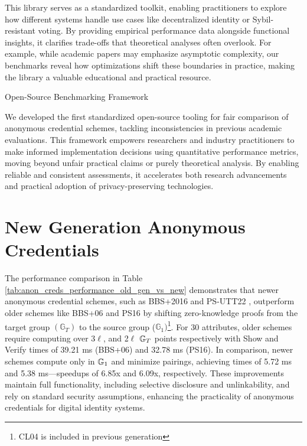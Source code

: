 This library serves as a standardized toolkit, enabling practitioners to explore how different systems handle use cases like decentralized identity or Sybil-resistant voting. By providing empirical performance data alongside functional insights, it clarifies trade-offs that theoretical analyses often overlook. For example, while academic papers may emphasize asymptotic complexity, our benchmarks reveal how optimizations shift these boundaries in practice, making the library a valuable educational and practical resource.

Open-Source Benchmarking Framework

We developed the first standardized open-source tooling for fair comparison of anonymous credential schemes, tackling inconsistencies in previous academic evaluations. This framework empowers researchers and industry practitioners to make informed implementation decisions using quantitative performance metrics, moving beyond unfair practical claims or purely theoretical analysis. By enabling reliable and consistent assessments, it accelerates both research advancements and practical adoption of privacy-preserving technologies.










\section{New Generation Anonymous Credentials}
The performance comparison in Table \ref{tab:anon_creds_performance_old_gen_vs_new} demonstrates that newer anonymous credential schemes, such as BBS+2016 \cite{camenisch_anonymous_2016} and PS-UTT22 \cite{tomescu_utt_2022}, outperform older schemes like BBS+06 \cite{hutchison_constant-size_2006} and PS16 \cite{sako_short_2016} by shifting zero-knowledge proofs from the target group $(\mathbb{G}_T)$ to the source group ($\mathbb{G}_1)$\footnote{CL04 \cite{hutchison_signature_2004} is included in previous generation}. For 30 attributes, older schemes require computing over 3$\ell$, and 2$\ell$ $\mathbb{G}_T$ points respectively with Show and Verify times of 39.21 ms (BBS+06) and 32.78 ms (PS16). In comparison, newer schemes compute only in $\mathbb{G}_1$ and minimize pairings, achieving times of 5.72 ms and 5.38 ms—speedups of 6.85x and 6.09x, respectively. These improvements maintain full functionality, including selective disclosure and unlinkability, and rely on standard security assumptions, enhancing the practicality of anonymous credentials for digital identity systems.


